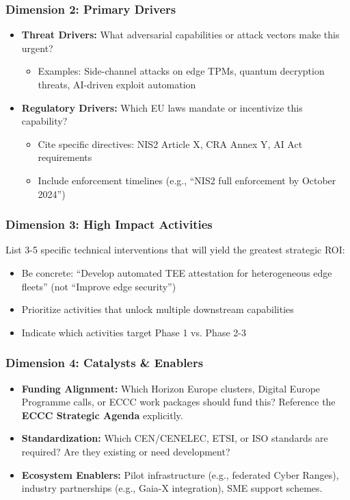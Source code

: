 \documentclass[12pt,a4paper]{article}
\begin{document}
\subsubsection*{Dimension 2: Primary Drivers}
\begin{itemize}
    \item \textbf{Threat Drivers:} What adversarial capabilities or attack vectors make this urgent?
    \begin{itemize}
        \item Examples: Side-channel attacks on edge TPMs, quantum decryption threats, AI-driven exploit automation
    \end{itemize}
    \item \textbf{Regulatory Drivers:} Which EU laws mandate or incentivize this capability?
    \begin{itemize}
        \item Cite specific directives: NIS2 Article X, CRA Annex Y, AI Act requirements
        \item Include enforcement timelines (e.g., ``NIS2 full enforcement by October 2024'')
    \end{itemize}
\end{itemize}

\subsubsection*{Dimension 3: High Impact Activities}
List 3-5 specific technical interventions that will yield the greatest strategic ROI:
\begin{itemize}
    \item Be concrete: ``Develop automated TEE attestation for heterogeneous edge fleets'' (not ``Improve edge security'')
    \item Prioritize activities that unlock multiple downstream capabilities
    \item Indicate which activities target Phase 1 vs. Phase 2-3
\end{itemize}

\subsubsection*{Dimension 4: Catalysts \& Enablers}
\begin{itemize}
    \item \textbf{Funding Alignment:} Which Horizon Europe clusters, Digital Europe Programme calls, or ECCC work packages should fund this? Reference the \textbf{ECCC Strategic Agenda} explicitly.
    \item \textbf{Standardization:} Which CEN/CENELEC, ETSI, or ISO standards are required? Are they existing or need development?
    \item \textbf{Ecosystem Enablers:} Pilot infrastructure (e.g., federated Cyber Ranges), industry partnerships (e.g., Gaia-X integration), SME support schemes.
\end{itemize}
\end{document}
